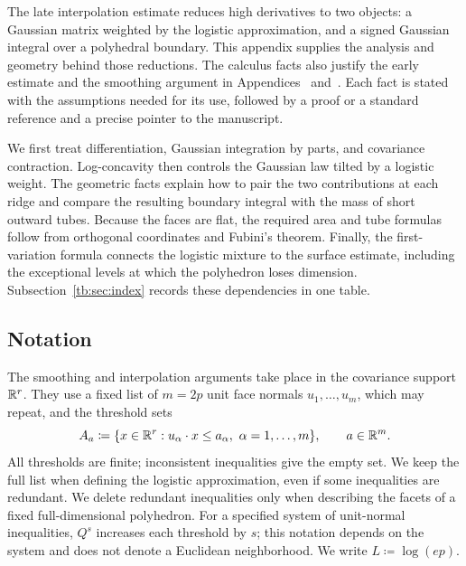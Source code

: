 \documentclass[11pt,letterpaper]{article}
\theoremstyle{plain}
\begin{document}
The late interpolation estimate reduces high derivatives to two objects:
a Gaussian matrix weighted by the logistic approximation, and a signed
Gaussian integral over a polyhedral boundary. This appendix supplies the
analysis and geometry behind those reductions. The calculus facts also
justify the early estimate and the smoothing argument in
Appendices~ and~.
Each fact is stated with the assumptions needed for its use, followed by
a proof or a standard reference and a precise pointer to the manuscript.

We first treat differentiation, Gaussian integration by parts, and
covariance contraction. Log-concavity then controls the Gaussian law
tilted by a logistic weight. The geometric facts explain how to pair the
two contributions at each ridge and compare the resulting boundary
integral with the mass of short outward tubes. Because the faces are
flat, the required area and tube formulas follow from orthogonal
coordinates and Fubini's theorem. Finally, the first-variation formula
connects the logistic mixture to the surface estimate, including the
exceptional levels at which the polyhedron loses dimension.
Subsection~\ref{tb:sec:index} records these dependencies in one table.

\subsection{Notation}\label{tb:sec:notation}

The smoothing and interpolation arguments take place in the covariance
support \(\mathbb R^r\). They use a fixed list of \(m=2p\) unit face normals
\(u_1,\ldots,u_m\), which may repeat, and the threshold sets
\[
 A_a\coloneqq\{x\in\mathbb R^r:u_\alpha\cdot x\le a_\alpha,
                          \ \alpha=1,\ldots,m\},\qquad a\in\mathbb R^m.
\]
All thresholds are finite; inconsistent inequalities give the empty set.
We keep the full list when defining the logistic approximation, even if
some inequalities are redundant. We delete redundant inequalities only
when describing the facets of a fixed full-dimensional polyhedron.
For a specified system of unit-normal inequalities, \(Q^s\) increases
each threshold by \(s\); this notation depends on the system and does
not denote a Euclidean neighborhood. We write \(L\coloneqq\log(ep)\).
\end{document}
